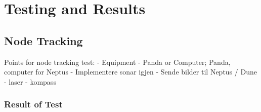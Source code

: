 \chapter{Testing and Results}
\section{Node Tracking}
Points for node tracking test:
- Equipment
	- Panda or Computer; Panda, computer for Neptus
	- Implementere sonar igjen
	- Sende bilder til Neptus / Dune
	- laser
	- kompass
\subsection{Result of Test}